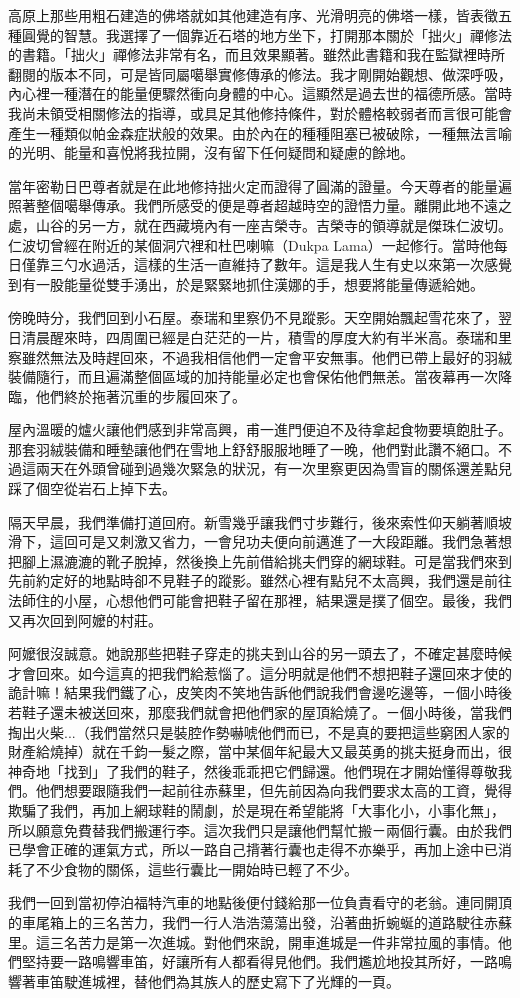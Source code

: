高原上那些用粗石建造的佛塔就如其他建造有序、光滑明亮的佛塔一樣，皆表徵五種圓覺的智慧。我選擇了一個靠近石塔的地方坐下，打開那本關於「拙火」禪修法的書籍。「拙火」禪修法非常有名，而且效果顯著。雖然此書籍和我在監獄裡時所翻閱的版本不同，可是皆同屬噶舉實修傳承的修法。我才剛開始觀想、做深呼吸，內心裡一種潛在的能量便驟然衝向身體的中心。這顯然是過去世的福德所感。當時我尚未領受相關修法的指導，或具足其他修持條件，對於體格較弱者而言很可能會產生一種類似帕金森症狀般的效果。由於內在的種種阻塞已被破除，一種無法言喻的光明、能量和喜悅將我拉開，沒有留下任何疑問和疑慮的餘地。

當年密勒日巴尊者就是在此地修持拙火定而證得了圓滿的證量。今天尊者的能量遍照著整個噶舉傳承。我們所感受的便是尊者超越時空的證悟力量。離開此地不遠之處，山谷的另一方，就在西藏境內有一座吉榮寺。吉榮寺的領導就是傑珠仁波切。仁波切曾經在附近的某個洞穴裡和杜巴喇嘛（Dukpa
Lama）一起修行。當時他每日僅靠三勺水過活，這樣的生活一直維持了數年。這是我人生有史以來第一次感覺到有一股能量從雙手湧出，於是緊緊地抓住漢娜的手，想要將能量傳遞給她。

傍晚時分，我們回到小石屋。泰瑞和里察仍不見蹤影。天空開始飄起雪花來了，翌日清晨醒來時，四周圍已經是白茫茫的一片，積雪的厚度大約有半米高。泰瑞和里察雖然無法及時趕回來，不過我相信他們一定會平安無事。他們已帶上最好的羽絨裝備隨行，而且遍滿整個區域的加持能量必定也會保佑他們無恙。當夜幕再一次降臨，他們終於拖著沉重的步履回來了。

屋內溫暖的爐火讓他們感到非常高興，甫一進門便迫不及待拿起食物要填飽肚子。那套羽絨裝備和睡墊讓他們在雪地上舒舒服服地睡了一晚，他們對此讚不絕口。不過這兩天在外頭曾碰到過幾次緊急的狀況，有一次里察更因為雪盲的關係還差點兒踩了個空從岩石上掉下去。

隔天早晨，我們準備打道回府。新雪幾乎讓我們寸步難行，後來索性仰天躺著順坡滑下，這回可是又刺激又省力，一會兒功夫便向前邁進了一大段距離。我們急著想把腳上濕漉漉的靴子脫掉，然後換上先前借給挑夫們穿的網球鞋。可是當我們來到先前約定好的地點時卻不見鞋子的蹤影。雖然心裡有點兒不太高興，我們還是前往法師住的小屋，心想他們可能會把鞋子留在那裡，結果還是撲了個空。最後，我們又再次回到阿嬤的村莊。

阿嬤很沒誠意。她說那些把鞋子穿走的挑夫到山谷的另一頭去了，不確定甚麼時候才會回來。如今這真的把我們給惹惱了。這分明就是他們不想把鞋子還回來才使的詭計嘛！結果我們鐵了心，皮笑肉不笑地告訴他們說我們會邊吃邊等，ㄧ個小時後若鞋子還未被送回來，那麼我們就會把他們家的屋頂給燒了。ㄧ個小時後，當我們掏出火柴...（我們當然只是裝腔作勢嚇唬他們而已，不是真的要把這些窮困人家的財產給燒掉）就在千鈞一髮之際，當中某個年紀最大又最英勇的挑夫挺身而出，很神奇地「找到」了我們的鞋子，然後乖乖把它們歸還。他們現在才開始懂得尊敬我們。他們想要跟隨我們一起前往赤蘇里，但先前因為向我們要求太高的工資，覺得欺騙了我們，再加上網球鞋的鬧劇，於是現在希望能將「大事化小，小事化無」，所以願意免費替我們搬運行李。這次我們只是讓他們幫忙搬ㄧ兩個行囊。由於我們已學會正確的運氣方式，所以一路自己揹著行囊也走得不亦樂乎，再加上途中已消耗了不少食物的關係，這些行囊比一開始時已輕了不少。

我們一回到當初停泊福特汽車的地點後便付錢給那一位負責看守的老翁。連同開頂的車尾箱上的三名苦力，我們一行人浩浩蕩蕩出發，沿著曲折蜿蜒的道路駛往赤蘇里。這三名苦力是第一次進城。對他們來說，開車進城是一件非常拉風的事情。他們堅持要一路鳴響車笛，好讓所有人都看得見他們。我們尷尬地投其所好，一路鳴響著車笛駛進城裡，替他們為其族人的歷史寫下了光輝的一頁。

